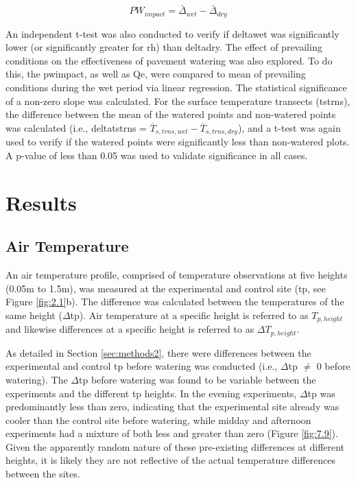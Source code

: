 \documentclass[final,3p,times,authoryear]{elsarticle}
\begin{document}
\begin{equation}
PW_{impact} = \bar{\Delta}_{wet} - \bar{\Delta}_{dry}
\label{eq:2.2} 
\end{equation}

An independent t-test was also conducted to verify if \gls{deltawet} was significantly lower (or significantly greater for \gls{rh}) than \gls{deltadry}. The effect of prevailing conditions on the effectiveness of pavement watering was also explored. To do this, the \gls{pwimpact}, as well as \gls{Qe}, were compared to mean of prevailing conditions during the wet period via linear regression. The statistical significance of a non-zero slope was calculated. For the surface temperature transects (\gls{tstrns}), the difference between the mean of the watered points and non-watered points was calculated (i.e., \gls{deltatstrns} = $\overline{T}_{s,trns,wet} - \overline{T}_{s,trns,dry}$), and a t-test was again used to verify if the watered points were significantly less than non-watered plots. A \gls{p}-value of less than 0.05 was used to validate significance in all cases.

\section{Results}\label{sec:discussion3}
\subsection{Air Temperature}\label{sec:discussion3.1}

An air temperature profile, comprised of temperature observations at five heights (0.05m to 1.5m), was measured at the experimental and control site (\gls{tp}, see Figure \ref{fig:2.1}b). The difference was calculated between the temperatures of the same height ($\Delta$\gls{tp}). Air temperature at a specific height is referred to as $T_{p,height}$ and likewise differences at a specific height is referred to as $\Delta$$T_{p,height}$.

As detailed in Section \ref{sec:methods2}, there were differences between the experimental
and control \gls{tp} before watering was conducted (i.e., $\Delta$\gls{tp} $\neq$ 0 before watering). The $\Delta$\gls{tp} before watering was found to be variable between the experiments and the different \gls{tp} heights. In the evening experiments, $\Delta$\gls{tp} was predominantly less than zero, indicating that the experimental site already was cooler than the control site before watering, while midday and afternoon experiments had a mixture of both less and greater than zero (Figure \ref{fig:7.9}). Given the apparently random nature of these pre-existing differences at different heights, it is likely they are not reflective of the actual temperature differences between the sites.
\end{document}
